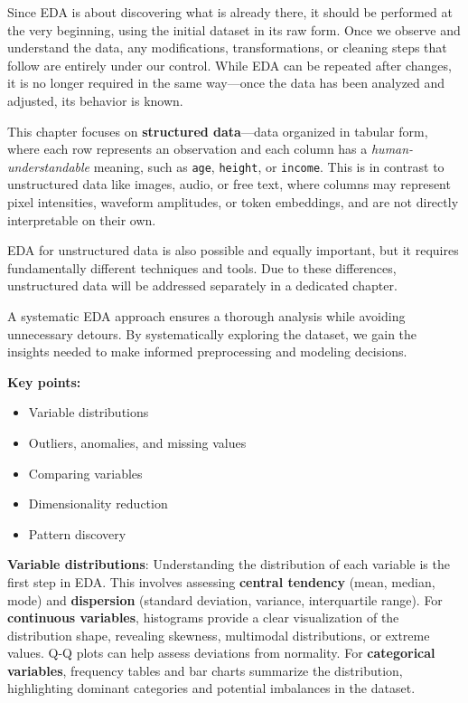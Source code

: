 \documentclass[12pt,openany, draft]{book}
\begin{document}
Since EDA is about discovering what is already there, it should be performed 
at the very beginning, using the initial dataset in its raw form. Once we 
observe and understand the data, any modifications, transformations, or 
cleaning steps that follow are entirely under our control. While EDA can be 
repeated after changes, it is no longer required in the same way—once the 
data has been analyzed and adjusted, its behavior is known. \newline

This chapter focuses on \textbf{structured data}—data organized in tabular 
form, where each row represents an observation and each column has a 
\textit{human-understandable} meaning, such as \texttt{age}, \texttt{height}, 
or \texttt{income}. This is in contrast to unstructured data like images, 
audio, or free text, where columns may represent pixel intensities, 
waveform amplitudes, or token embeddings, and are not directly interpretable 
on their own. \newline

EDA for unstructured data is also possible and equally important, but it 
requires fundamentally different techniques and tools. Due to these 
differences, unstructured data will be addressed separately in a dedicated 
chapter. \newline

A systematic EDA approach ensures a thorough analysis while avoiding 
unnecessary detours. By systematically exploring the dataset, we gain the 
insights needed to make informed preprocessing and modeling decisions.
\newline


\textbf{Key points:}
\begin{itemize}
    \item Variable distributions
    \item Outliers, anomalies, and missing values
    \item Comparing variables
    \item Dimensionality reduction
    \item Pattern discovery
\end{itemize}

\textbf{Variable distributions}: Understanding the distribution of each variable is the first step in EDA. This involves assessing \textbf{central tendency} (mean, median, mode) and \textbf{dispersion} (standard deviation, variance, interquartile range). For \textbf{continuous variables}, histograms provide a clear visualization of the distribution shape, revealing skewness, multimodal distributions, or extreme values. Q-Q plots can help assess deviations from normality. For \textbf{categorical variables}, frequency tables and bar charts summarize the distribution, highlighting dominant categories and potential imbalances in the dataset.
\newline
\end{document}
